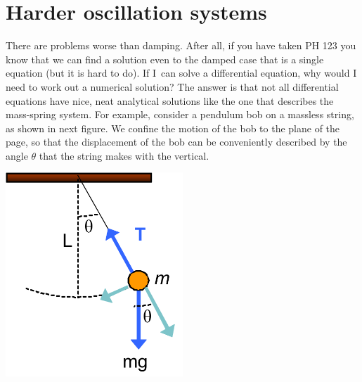 \documentclass[twoside,11pt,ShortChapTitles]{BYUTextbook}
\begin{document}
\section{Harder oscillation systems}

There are problems worse than damping. After all, if you have taken PH 123
you know that we can find a solution even to the damped case that is a
single equation (but it is hard to do). If I\ can solve a differential
equation, why would I need to work out a numerical solution? The answer is
that not all differential equations have nice, neat analytical solutions
like the one that describes the mass-spring system. For example, consider a
pendulum bob on a massless string, as shown in next figure. We confine the
motion of the bob to the plane of the page, so that the displacement of the
bob can be conveniently described by the angle $\theta $ that the string
makes with the vertical.
\begin{center}
\includegraphics[width=0.5\textwidth]{Lab8_figs/simple_pendulum.pdf}

\end{center}
\end{document}
